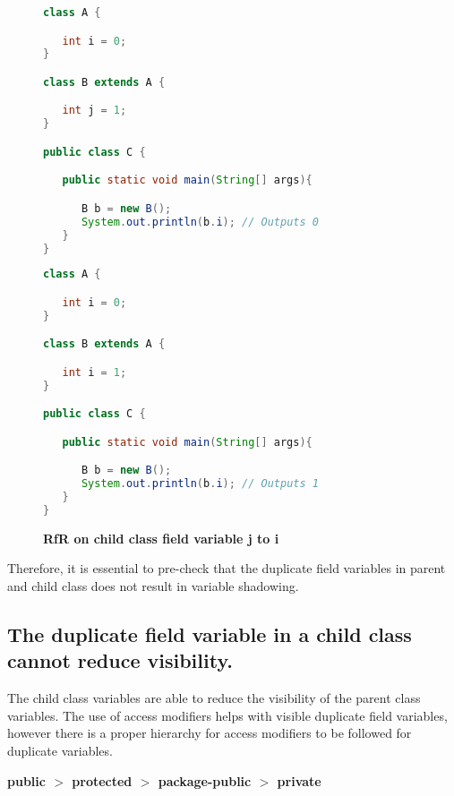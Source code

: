 \begin{figure}[th]
\centering
\begin{minipage}[t]{0.75\linewidth}
\begin{lstlisting}[language=java, basicstyle=\scriptsize\ttfamily,frame=single]
class A {

   int i = 0;
}

class B extends A {

   int j = 1; 
}

public class C {

   public static void main(String[] args){

      B b = new B();
      System.out.println(b.i); // Outputs 0
   }
}
\end{lstlisting}
\end{minipage}
\hfill
\begin{minipage}[t]{0.75\linewidth}
\begin{lstlisting}[language=java, basicstyle=\scriptsize\ttfamily,frame=single]
class A {

   int i = 0;
}

class B extends A {

   int i = 1; 
}

public class C {

   public static void main(String[] args){

      B b = new B();
      System.out.println(b.i); // Outputs 1
   }
}
\end{lstlisting}
\end{minipage}
\caption{\textbf{RfR on child class field variable j to i}}
\label{figure:classEx}
\end{figure}

Therefore, it is essential to pre-check that the duplicate field variables in parent and child class does not result in variable shadowing. 

\subsection{The duplicate field variable in a child class cannot reduce visibility.}

The child class variables are able to reduce the visibility of the parent class variables. The use of access modifiers helps with visible duplicate field variables, however there is a proper hierarchy for access modifiers to be followed for duplicate variables.


\begin{center}
\textbf{public $>$ protected $>$ package-public $>$ private}
\end{center}


